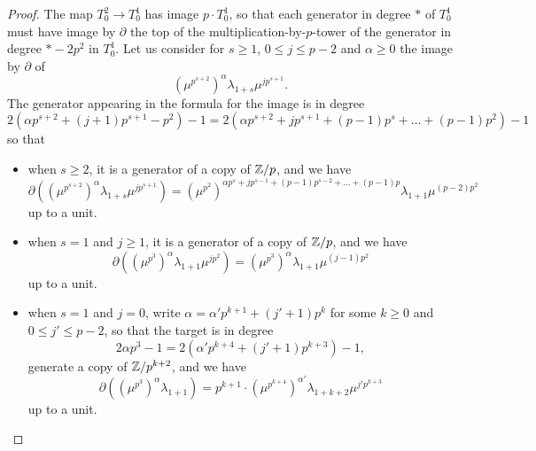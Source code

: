 \begin{proof}

The map $T_0^2 \rightarrow T_0^1$ has image $p \cdot T_0^1$, so that each generator in degree $*$ of $T_0^1$ must have image by $\partial$ the top of the multiplication-by-$p$-tower of the generator in degree $*-2p^2$ in $T_0^1$. Let us consider for $s \geq 1$, $0 \leq j \leq p-2$ and $\alpha \geq 0$ the image by $\partial$ of
\begin{equation}
  \left(\mu^{p^{s+2}}\right)^\alpha \lambda_{1+s}\mu^{j p^{s+1}}.
\end{equation}
The generator appearing in the formula for the image is in degree
\begin{equation}
  2(\alpha p^{s+2} + (j+1)p^{s+1} - p^2) - 1
  = 2(\alpha p^{s+2} + jp^{s+1} + (p-1)p^s + \dots + (p-1)p^2) - 1
\end{equation}
so that
\begin{itemize}
\item when $s \geq 2$, it is a generator of a copy of $\mathbb{Z}/p$, and we have
  \begin{equation}
    \partial\left(\left(\mu^{p^{s+2}}\right)^\alpha \lambda_{1+s}\mu^{j p^{s+1}}\right) = \left(\mu^{p^2}\right)^{\alpha p^s + j p^{s-1} + (p-1)p^{s-2} + \dots + (p-1)p} \lambda_{1 + 1} \mu^{(p-2)p^2}
  \end{equation}
  up to a unit.
\item when $s=1$ and $j \geq 1$, it is a generator of a copy of $\mathbb{Z}/p$, and we have
  \begin{equation}
    \partial\left(\left(\mu^{p^3}\right)^\alpha \lambda_{1+1}\mu^{j p^2}\right) = \left(\mu^{p^3}\right)^\alpha \lambda_{1 + 1} \mu^{(j-1)p^2}
  \end{equation}
up to a unit.
\item when $s=1$ and $j=0$, write $\alpha = \alpha' p^{k+1} + (j' + 1)p^k$ for some $k \geq 0$ and $0 \leq j' \leq p - 2$, so that the target is in degree
  \begin{equation}
    2 \alpha p^3 - 1 = 2(\alpha' p^{k+4} + (j' + 1)p^{k+3}) - 1,
  \end{equation}
  generate a copy of $\mathbb{Z}/p^{k+2}$, and we have
  \begin{equation}
    \partial\left(\left(\mu^{p^3}\right)^\alpha \lambda_{1+1}\right) = p^{k+1} \cdot \left(\mu^{p^{k+4}}\right)^{\alpha'} \lambda_{1 + k + 2} \mu^{j'p^{k+3}}
  \end{equation}
  up to a unit.
\end{itemize}



\end{proof}
